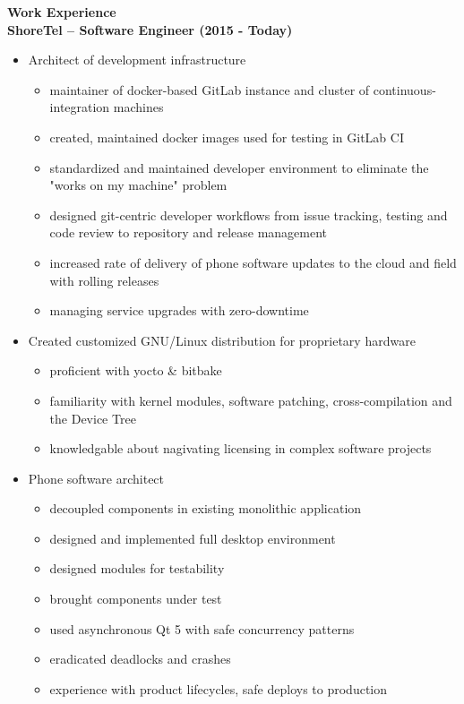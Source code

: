 \documentclass{report}
\begin{document}
\textbf{Work Experience} \\
  \textbf{ShoreTel -- Software Engineer (2015 - Today)}
  \begin{itemize}
  \item Architect of development infrastructure
    \begin{itemize}[label=$\circ$]
    \item maintainer of docker-based GitLab instance and cluster of continuous-integration machines
    \item created, maintained docker images used for testing in GitLab CI
    \item standardized and maintained developer environment to eliminate the "works on my machine" problem
    \item designed git-centric developer workflows from issue tracking, testing and code review to repository and release management
    \item increased rate of delivery of phone software updates to the cloud and field with rolling releases
    \item managing service upgrades with zero-downtime
  \end{itemize}

    \item Created customized GNU/Linux distribution for proprietary hardware
    \begin{itemize}[label=$\circ$]
      \item proficient with yocto \& bitbake
      \item familiarity with kernel modules, software patching, cross-compilation and the Device Tree
      \item knowledgable about nagivating licensing in complex software projects
    \end{itemize}

  \item Phone software architect
    \begin{itemize}[label=$\circ$]
      \item decoupled components in existing monolithic application
      \item designed and implemented full desktop environment
      \item designed modules for testability
      \item brought components under test
      \item used asynchronous Qt 5 with safe concurrency patterns
      \item eradicated deadlocks and crashes
      \item experience with product lifecycles, safe deploys to production
    \end{itemize}

  \end{itemize}
\end{document}
